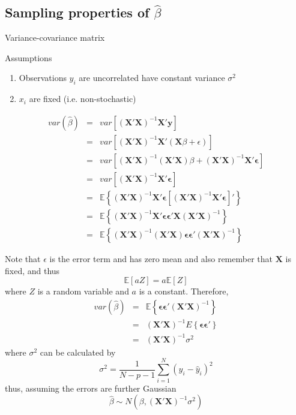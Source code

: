 \documentclass{beamer}
\newcommand{\E}{\mathbb{E}}
\begin{document}
\subsection{Sampling properties of $\hat{\beta}$}
\begin{frame}{Variance-covariance matrix}
\begin{block}{Assumptions}
\begin{enumerate}
\item{} Observations $y_i$ are uncorrelated have constant variance $\sigma^2$
\item{} $x_i$ are fixed (i.e. non-stochastic)
\end{enumerate}
\end{block}
\begin{eqnarray*}
var(\hat{\beta})&=&var\left[(\bm{X}'\bm{X})^{-1}\bm{X}'\bm{y}\right]\\
&=&var\left[(\bm{X}'\bm{X})^{-1}\bm{X}'(\bm{X}\beta+\epsilon)\right]\\
&=&var\left[(\bm{X}'\bm{X})^{-1}(\bm{X}'\bm{X})\beta+(\bm{X}'\bm{X})^{-1}\bm{X}'\bm{\epsilon}\right]\\
&=&var\left[(\bm{X}'\bm{X})^{-1}\bm{X}'\bm{\epsilon}\right]\\
&=&\E\left\{(\bm{X}'\bm{X})^{-1}\bm{X}'\bm{\epsilon}[(\bm{X}'\bm{X})^{-1}\bm{X}'\bm{\epsilon}]'\right\}\\
&=&\E\left\{(\bm{X}'\bm{X})^{-1}\bm{X}'\bm{\epsilon}\bm{\epsilon}'\bm{X}(\bm{X}'\bm{X})^{-1}\right\}\\
&=&\E\left\{(\bm{X}'\bm{X})^{-1}(\bm{X}'\bm{X})\bm{\epsilon}\bm{\epsilon}'(\bm{X}'\bm{X})^{-1}\right\}
\end{eqnarray*}
\end{frame}

\begin{frame}
Note that $\epsilon$ is the error term and has zero mean and also remember that $\bm{X}$ is fixed, and thus 
\[
\E[aZ]=a\E[Z]
\]
where $Z$ is a random variable and $a$ is a constant. Therefore, 
\begin{eqnarray*}
var(\hat{\beta})&=&\E\left\{\bm{\epsilon}\bm{\epsilon}'(\bm{X}'\bm{X})^{-1}\right\}\\
&=&(\bm{X}'\bm{X})^{-1}E\left\{\bm{\epsilon}\bm{\epsilon}'\right\}\\
&=&(\bm{X}'\bm{X})^{-1}\sigma^2
\end{eqnarray*}
where $\sigma^2$ can be calculated by
\[
\sigma^2=\frac{1}{N-p-1}\sum\limits_{i=1}^N(y_i-\hat{y}_i)^2
\]
thus, assuming the errors are further Gaussian
\[
\hat{\beta}\sim N(\beta,(\bm{X}'\bm{X})^{-1}\sigma^2)
\]
\end{frame}
\end{document}
